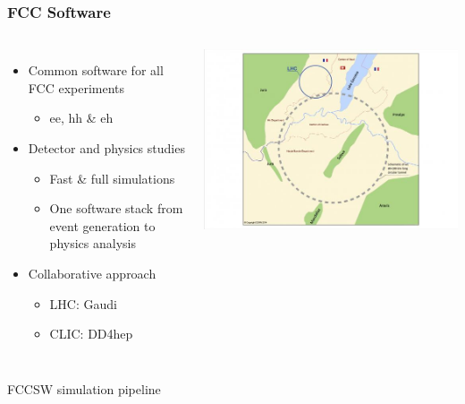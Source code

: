 \documentclass[hyperref={colorlinks=true,pdfpagelabels=false,linkcolor=black}, xcolor=dvipsnames,10pt]{beamer}
\begin{document}
\begin{frame}
	\frametitle{FCC Software}
	
	\begin{columns}
	\begin{itemize}
	\item Common software for all FCC experiments
		\begin{itemize}
		\item ee, hh \& eh
		\end{itemize}
	\item Detector and physics studies
		\begin{itemize}
		\item Fast \& full simulations
		\item One software stack from event generation to physics analysis
		\end{itemize}
	\item Collaborative approach
		\begin{itemize}
		\item LHC: Gaudi
		\item CLIC: DD4hep
		\end{itemize}
	\end{itemize}
	
	\centering
	\includegraphics[width=\textwidth]{../figures/cernFCC}
	\end{columns}
	
	\vspace{0.5cm}

	\begin{block}{FCCSW simulation pipeline}
	\end{block}

\end{frame}
\end{document}
